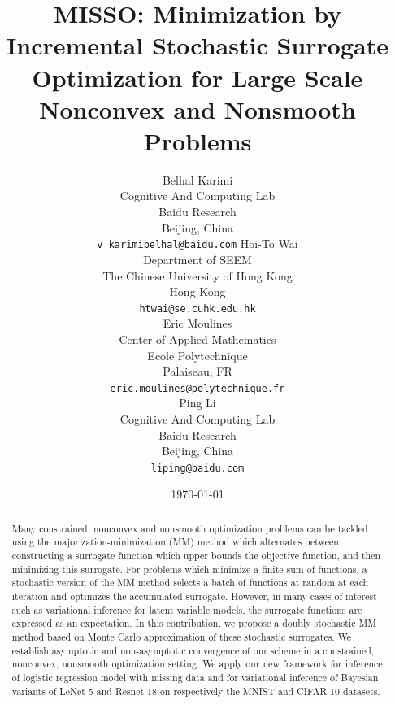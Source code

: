 \documentclass[11pt]{article}
\theoremstyle{t}
\begin{document}
\title{\vspace{-0.1in}MISSO: Minimization by Incremental Stochastic Surrogate Optimization for Large Scale Nonconvex and Nonsmooth Problems\vspace{-0.1in}}

\author{
  Belhal Karimi \\
  Cognitive And Computing Lab\\
  Baidu Research\\
  Beijing, China \\
  \texttt{v_karimibelhal@baidu.com} 
   \And
   Hoi-To Wai \\
   Department of SEEM\\
   The Chinese University of Hong Kong\\
   Hong Kong \\
   \texttt{htwai@se.cuhk.edu.hk} \\
   \And
   Eric Moulines \\
   Center of Applied Mathematics\\
   Ecole Polytechnique\\
   Palaiseau, FR \\
   \texttt{eric.moulines@polytechnique.fr} \\
   \And
  Ping Li \\
  Cognitive And Computing Lab\\
  Baidu Research\\
  Beijing, China \\
  \texttt{liping@baidu.com} \\
}

\date{\today}

\maketitle

\begin{abstract}\vspace{-0.15in}
Many constrained, nonconvex and nonsmooth optimization problems can be tackled using the majorization-minimization (MM) method which alternates between constructing a surrogate function which upper bounds the objective function, and then minimizing this surrogate.
For problems which minimize a finite sum of functions, a stochastic version of the MM method selects a batch of functions at random at each iteration and optimizes the accumulated surrogate.
However, in many cases of interest such as  variational inference for latent variable models, the surrogate functions are expressed as an expectation. In this contribution, we propose a doubly stochastic MM method based on Monte Carlo approximation of these stochastic surrogates.
We establish asymptotic and non-asymptotic convergence of our scheme in a constrained, nonconvex, nonsmooth optimization setting.
We apply our new framework for inference of logistic regression model with missing data and for variational inference of Bayesian variants of LeNet-5 and Resnet-18 on respectively the MNIST and CIFAR-10 datasets.
\end{abstract}
\end{document}
